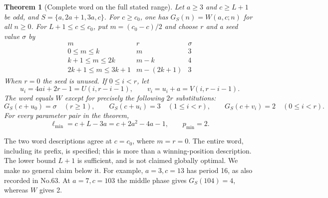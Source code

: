 \documentclass[10pt,a4paper]{article}
\newtheorem{theorem}{Theorem}
\begin{document}
\begin{theorem}[Complete word on the full stated range]\label{main}
Let $a\ge3$ and $c\ge L+1$ be odd, and $S=\{a,2a+1,3a,c\}$.
For $c\ge c_0$, one has $G_S(n)=W(a,c;n)$ for all $n\ge0$.
For $L+1\le c\le c_0$, put $m=(c_0-c)/2$ and choose $r$ and a seed value $\sigma$ by
\begin{equation}\label{phases}
\begin{array}{c|c|c}
 m& r&\sigma\\\hline
 0\le m\le k&m&3\\
 k+1\le m\le2k&m-k&4\\
 2k+1\le m\le3k+1&m-(2k+1)&3
\end{array}
\end{equation}
When $r=0$ the seed is unused. If $0\le i<r$, let
\begin{equation}\label{chainoffsets}
 u_i=4ai+2r-1=U(i,r-i-1),\qquad v_i=u_i+a=V(i,r-i-1).
\end{equation}
The word equals $W$ except for precisely the following $2r$ substitutions:
\begin{equation}\label{correction}
 G_S(c+u_0)=\sigma\quad(r\ge1),\qquad
 G_S(c+u_i)=3\quad(1\le i<r),\qquad
 G_S(c+v_i)=2\quad(0\le i<r).
\end{equation}
For every parameter pair in the theorem,
\begin{equation}\label{minimal}
 \ell_{\min}=c+L-3a=c+2a^2-4a-1,\qquad p_{\min}=2.
\end{equation}
\end{theorem}
The two word descriptions agree at $c=c_0$, where $m=r=0$. The entire word, including its prefix, is specified; this is more than a winning-position description. The lower bound $L+1$ is sufficient, and is not claimed globally optimal. We make no general claim below it. For example, $a=3,c=13$ has period 16, as also recorded in No.63. At $a=7,c=103$ the middle phase gives $G_S(104)=4$, whereas $W$ gives 2.
\end{document}
